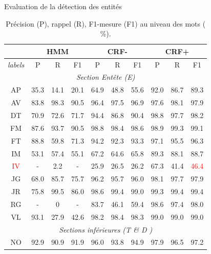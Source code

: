 \documentclass[newPxFont,pagenumber]{beamer}
\begin{document}
\begin{frame}[c]{Evaluation de la détection des entités}
\begin{table}[!htb]
\footnotesize
\centering
\begin{tabular}{|c|c|c|c|c|c|c|c|c|c|}
\hline
 & \multicolumn{3}{c|}{HMM}  & \multicolumn{3}{c|}{CRF-}  & \multicolumn{3}{c|}{CRF+} \\
\hline
\textit{labels} & P & R & F1 & P & R & F1 & P & R & F1 \\
\hline
 \multicolumn{10}{|c|}{\textit{\textit{Section Entête (E)}}} \\
\hline
 AP & 35.3 &  14.1 & 20.1  & 64.9 & 48.8 & 55.6 & 92.0 & 86.7 & 89.3 \\
\hline
 AV & 83.8 &  98.3 & 90.5  & 96.4 & 97.5 & 96.9 & 97.6 & 98.1 & 97.9 \\
 \hline
 DT & 70.9 & 72.6 & 71.7  & 94.4 & 86.8 & 90.4 & 98.8 & 97.7 & 98.2 \\
 \hline
FM & 87.6 &  93.7 & 90.5  & 98.8 & 98.4 & 98.6 & 98.9 & 99.3 & 99.1 \\
 \hline
FT &  88.8 & 59.8 & 71.3  & 94.2 & 92.3 & 93.3 & 97.1 & 95.5 & 96.3 \\
 \hline
IM  & 53.1 & 57.4 & 55.1  & 67.2 & 64.6 & 65.8 &  89.3 & 88.1 & 88.7  \\
 \hline
 \textcolor{red}{IV} & - & 2.2 & - & 25.9 & 26.5 & 26.2 & 67.3 & 41.4 & \textcolor{red}{46.4} \\
 \hline
JG  & 68.0 & 85.7 & 75.7  & 96.2 & 95.7 & 96.0 & 98.1 & 97.7 & 97.9 \\
 \hline
JR  & 75.8 & 99.5 & 86.0  & 98.6 & 99.4 & 99.0 & 99.3 & 99.4 & 99.4 \\
 \hline
RG  &  - & 0  & - & 83.7 & 46.1 & 59.4 & 98.6 & 97.4 & 98.0 \\
\hline
VL & 93.1 & 27.9 & 42.6  & 98.2 & 98.4 & 98.3 & 99.0 & 99.0 & 99.0 \\
\hline
 \multicolumn{10}{|c|}{\textit{\textit{Sections inférieures (T \& D )}}} \\
 \hline
NO & 92.9 & 90.9 & 91.9 & 96.0 & 93.8 & 94.9 & 97.9 & 96.5 & 97.2\\
\hline
\end{tabular}
\caption{Précision (P), rappel (R), F1-mesure (F1) au niveau des mots ($\%$).}\label{prf-entity}
\end{table}
\end{frame}

%
%
\end{document}
